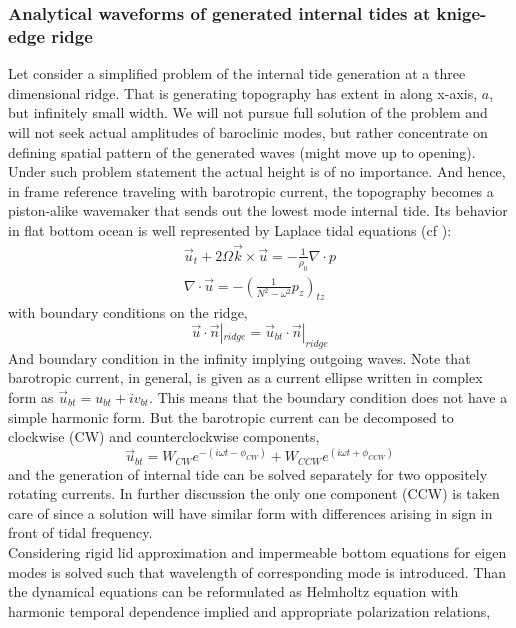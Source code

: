 \subsubsection{Analytical waveforms of generated internal tides at knige-edge ridge}
Let consider a simplified problem of the internal tide generation at a three dimensional ridge. That is generating topography has extent in along x-axis, $a$, but infinitely small width. We will not pursue full solution of the problem and will not seek actual amplitudes of baroclinic modes, but rather concentrate on defining spatial pattern of the generated waves (might move up to opening). Under such problem statement the actual height is of no importance. And hence, in frame reference traveling with barotropic current, the topography becomes a piston-alike wavemaker that sends out the lowest mode internal tide. Its behavior in flat bottom ocean is well represented by Laplace tidal equations (cf \cite{kelly2012cascade}):
\begin{align}
\vec{u}_t + 2 \Omega \vec{k} \times \vec{u} = - \frac{1}{\rho_0} \nabla \cdot p\\
\nabla \cdot \vec{u} = -(\frac{1}{N^2 - \omega^2}p_z)_{tz}
\end{align}
with boundary conditions on the ridge,
\begin{equation}
\vec{u}\cdot \vec{n}|_{ridge} = \vec{u}_{bt} \cdot \vec{n} |_{ridge}
\end{equation}
And boundary condition in the infinity implying outgoing waves. Note that barotropic current, in general, is given as a current ellipse written in complex form as $\vec{u}_{bt} = u_{bt} + i v_{bt}$. This means that the boundary condition does not have a simple harmonic form. But the barotropic current can be decomposed to clockwise (CW) and counterclockwise components,
\begin{equation}
\vec{u}_{bt} = W_{CW} e^{-(i \omega t - \phi_{CW})} + W_{CCW} e^{(i \omega t + \phi_{CCW})}
\end{equation}
and the generation of internal tide can be solved separately for two oppositely rotating currents. In further discussion the only one component (CCW) is taken care of since a solution will have similar form with differences arising in sign in front of tidal frequency.\\
Considering rigid lid approximation and impermeable bottom equations for eigen modes is solved such that wavelength of corresponding mode is introduced. Than the dynamical equations can be reformulated as Helmholtz equation with harmonic temporal dependence implied and appropriate polarization relations,
